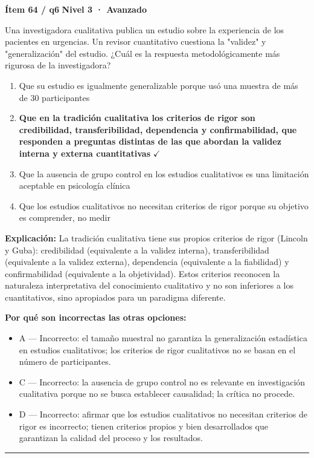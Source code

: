 \documentclass[12pt,a4paper]{article}
\begin{document}
\begin{mdframed}[backgroundcolor=fondogris,linecolor=rojo,linewidth=1pt,innerleftmargin=10pt,innerrightmargin=10pt,innertopmargin=7pt,innerbottommargin=7pt]
\textbf{Ítem 64 / q6} \hfill {\small\bfseries\color{rojo} Nivel 3 · Avanzado}
\end{mdframed}

Una investigadora cualitativa publica un estudio sobre la experiencia de los pacientes en urgencias. Un revisor cuantitativo cuestiona la "validez" y "generalización" del estudio. ¿Cuál es la respuesta metodológicamente más rigurosa de la investigadora?

\begin{enumerate}
  \item[A.] Que su estudio es igualmente generalizable porque usó una muestra de más de 30 participantes
  \item[\textbf{\color{verde}B.}] \textbf{\color{verde} Que en la tradición cualitativa los criterios de rigor son credibilidad, transferibilidad, dependencia y confirmabilidad, que responden a preguntas distintas de las que abordan la validez interna y externa cuantitativas} \hfill $\checkmark$
  \item[C.] Que la ausencia de grupo control en los estudios cualitativos es una limitación aceptable en psicología clínica
  \item[D.] Que los estudios cualitativos no necesitan criterios de rigor porque su objetivo es comprender, no medir
\end{enumerate}

\noindent\textbf{\color{azul}Explicación:} La tradición cualitativa tiene sus propios criterios de rigor (Lincoln y Guba): credibilidad (equivalente a la validez interna), transferibilidad (equivalente a la validez externa), dependencia (equivalente a la fiabilidad) y confirmabilidad (equivalente a la objetividad). Estos criterios reconocen la naturaleza interpretativa del conocimiento cualitativo y no son inferiores a los cuantitativos, sino apropiados para un paradigma diferente.

\noindent\textbf{\color{gris}Por qué son incorrectas las otras opciones:}
\begin{itemize}
  \item {\small A — Incorrecto: el tamaño muestral no garantiza la generalización estadística en estudios cualitativos; los criterios de rigor cualitativos no se basan en el número de participantes.}
  \item {\small C — Incorrecto: la ausencia de grupo control no es relevante en investigación cualitativa porque no se busca establecer causalidad; la crítica no procede.}
  \item {\small D — Incorrecto: afirmar que los estudios cualitativos no necesitan criterios de rigor es incorrecto; tienen criterios propios y bien desarrollados que garantizan la calidad del proceso y los resultados.}
\end{itemize}
\vspace{8pt}\hrule\vspace{10pt}
\end{document}
